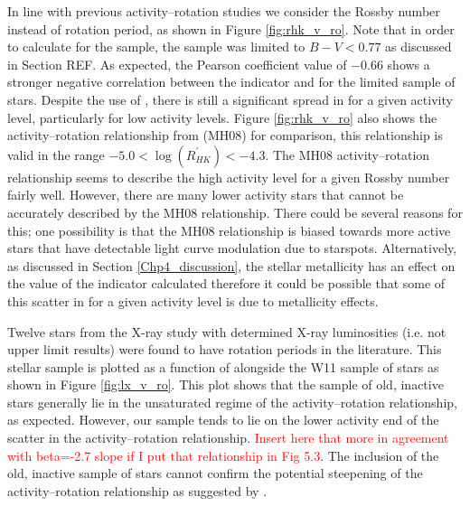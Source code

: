 In line with previous activity--rotation studies \citep{Mamajek_Hillenbrand_2008,Metcalfe_etal_2016} we consider the Rossby number instead of rotation period, as shown in Figure \ref{fig:rhk_v_ro}. Note that in order to calculate \Ro for the \citet{Baliunas_etal_1996} sample, the sample was limited to $B-V < 0.77$ as discussed in Section REF. As expected, the Pearson coefficient value of $-0.66$ shows a stronger negative correlation between the \Rprime indicator and \Ro for the limited \citet{Baliunas_etal_1996} sample of stars. Despite the use of \Ro, there is still a significant spread in \Ro for a given activity level, particularly for low activity levels. Figure \ref{fig:rhk_v_ro} also shows the activity--rotation relationship from \citet{Mamajek_Hillenbrand_2008} (MH08) for comparison, this relationship is valid in the range $-5.0 < \log(R^{'}_{HK}) < -4.3$. The MH08 activity--rotation relationship seems to describe the high activity level for a given Rossby number fairly well. However, there are many lower activity stars that cannot be accurately described by the MH08 relationship. There could be several reasons for this; one possibility is that the MH08 relationship is biased towards more active stars that have detectable light curve modulation due to starspots. Alternatively, as discussed in Section \ref{Chp4_discussion}, the stellar metallicity has an effect on the value of the \Rprime indicator calculated therefore it could be possible that some of this scatter in \Ro for a given activity level is due to metallicity effects.

Twelve stars from the X-ray study \citep{Booth_etal_2017} with determined X-ray luminosities (i.e. not upper limit results) were found to have rotation periods in the literature. This stellar sample is plotted as a function of \Ro alongside the W11 sample of stars as shown in Figure \ref{fig:lx_v_ro}. This plot shows that the sample of old, inactive stars generally lie in the unsaturated regime of the activity--rotation relationship, as expected. However, our sample tends to lie on the lower activity end of the scatter in the activity--rotation relationship. \textcolor{red}{Insert here that more in agreement with beta=-2.7 slope if I put that relationship in Fig 5.3}. The inclusion of the old, inactive sample of stars cannot confirm the potential steepening of the activity--rotation relationship as suggested by \citet{Booth_etal_2017}.

